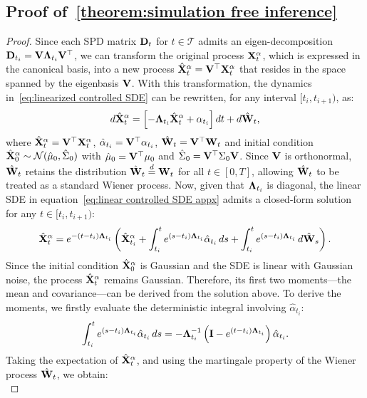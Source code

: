 \subsection{Proof of~\cref{theorem:simulation free inference}}
\label{sec:app:proof theorem}
\begin{proof} 

Since each SPD matrix \(\mathbf{D}_{t}\) for \(t \in \mathcal{T}\) admits an eigen-decomposition \(\mathbf{D}_{t_i} = \mathbf{V} \boldsymbol{\Lambda}_{t_i} \mathbf{V}^{\top}\), we can transform the original process \(\mathbf{X}^{\alpha}_t\), which is expressed in the canonical basis, into a new process \(\hat{\mathbf{X}}^{\alpha}_t = \mathbf{V}^\top \mathbf{X}^{\alpha}_t\) that resides in the space spanned by the eigenbasis \(\mathbf{V}\).  With this transformation, the dynamics in~\eqref{eq:linearized controlled SDE} can be rewritten, for any interval \([t_i, t_{i+1})\), as:
\[
\label{eq:linear controlled SDE appx}
d\hat{\mathbf{X}}^{\alpha}_t = \left[-\boldsymbol{\Lambda}_{t_i} \hat{\mathbf{X}}^{\alpha}_t + \alpha_{t_i}\right] dt + d\hat{\mathbf{W}}_t,
\]
where $\hat{\mathbf{X}}^{\alpha}_t = \mathbf{V}^\top \mathbf{X}^{\alpha}_t$, $\hat{\alpha}_{t_i} = \mathbf{V}^\top \alpha_{t_i}$, $\hat{\mathbf{W}}_t = \mathbf{V}^\top \mathbf{W}_t$ and initial condition $\hat{\mathbf{X}}^{\alpha}_0 \sim \mathcal{N}(\hat{\mu}_0, \hat{\Sigma}_0)$ with $\hat{\mu}_0 = \mathbf{V}^\top \mu_0$ and $\hat{\Sigma}_0 = \mathbf{V}^\top \Sigma_0 \mathbf{V}$. Since \(\mathbf{V}\) is orthonormal, \(\hat{\mathbf{W}}_t\) retains the distribution \(\hat{\mathbf{W}}_t \stackrel{d}{=} \mathbf{W}_t\) for all \(t \in [0, T]\), allowing \(\hat{\mathbf{W}}_t\) to be treated as a standard Wiener process. Now, given that \(\boldsymbol{\Lambda}_{t_i}\) is diagonal, the linear SDE in equation~\eqref{eq:linear controlled SDE appx} admits a closed-form solution for any \(t \in [t_i, t_{i+1})\):
\[
\hat{\mathbf{X}}^{\alpha}_t = e^{-(t - t_i)\boldsymbol{\Lambda}_{t_i}} \left( \hat{\mathbf{X}}^{\alpha}_{t_i} + \int_{t_i}^t e^{(s - t_i)\boldsymbol{\Lambda}_{t_i}} \hat{\alpha}_{t_i} \, ds + \int_{t_i}^t e^{(s - t_i)\boldsymbol{\Lambda}_{t_i}} \, d\hat{\mathbf{W}}_s \right).
\]
Since the initial condition \(\hat{\mathbf{X}}^{\alpha}_0\) is Gaussian and the SDE is linear with Gaussian noise, the process \(\hat{\mathbf{X}}^{\alpha}_t\) remains Gaussian. Therefore, its first two moments—the mean and covariance—can be derived from the solution above. To derive the moments, we firstly evaluate the deterministic integral involving \(\hat{\alpha}_{t_i}\):
\[
\int_{t_i}^t e^{(s - t_i)\boldsymbol{\Lambda}_{t_i}} \hat{\alpha}_{t_i} \, ds = -\boldsymbol{\Lambda}_{t_i}^{-1} \left( \mathbf{I} - e^{(t - t_i)\boldsymbol{\Lambda}_{t_i}}\right) \hat{\alpha}_{t_i}.
\]
Taking the expectation of \(\hat{\mathbf{X}}^{\alpha}_t\), and using the martingale property of the Wiener process \(\hat{\mathbf{W}}_t\), we obtain:
\[
\label{eq:mean recur}
\]
\end{proof}
